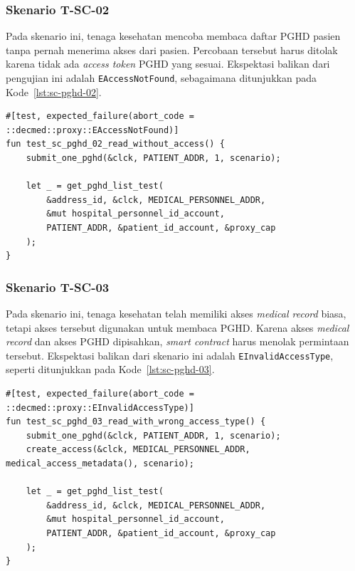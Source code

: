 \subsubsection{Skenario T-SC-02}

Pada skenario ini, tenaga kesehatan mencoba membaca daftar PGHD pasien tanpa pernah menerima akses dari pasien.
Percobaan tersebut harus ditolak karena tidak ada \textit{access token} PGHD yang sesuai.
Ekspektasi balikan dari pengujian ini adalah \texttt{EAccessNotFound}, sebagaimana ditunjukkan pada Kode~\ref{lst:sc-pghd-02}.

\begin{lstlisting}[caption={Pengujian baca PGHD tanpa akses pasien}, label={lst:sc-pghd-02}, float=htb]
#[test, expected_failure(abort_code = ::decmed::proxy::EAccessNotFound)]
fun test_sc_pghd_02_read_without_access() {
    submit_one_pghd(&clck, PATIENT_ADDR, 1, scenario);

    let _ = get_pghd_list_test(
        &address_id, &clck, MEDICAL_PERSONNEL_ADDR,
        &mut hospital_personnel_id_account,
        PATIENT_ADDR, &patient_id_account, &proxy_cap
    );
}
\end{lstlisting}

\subsubsection{Skenario T-SC-03}

Pada skenario ini, tenaga kesehatan telah memiliki akses \textit{medical record} biasa, tetapi akses tersebut digunakan untuk membaca PGHD\@.
Karena akses \textit{medical record} dan akses PGHD dipisahkan, \textit{smart contract} harus menolak permintaan tersebut.
Ekspektasi balikan dari skenario ini adalah \texttt{EInvalidAccessType}, seperti ditunjukkan pada Kode~\ref{lst:sc-pghd-03}.

\begin{lstlisting}[caption={Pengujian penggunaan akses medical record untuk membaca PGHD}, label={lst:sc-pghd-03}, float=htb]
#[test, expected_failure(abort_code = ::decmed::proxy::EInvalidAccessType)]
fun test_sc_pghd_03_read_with_wrong_access_type() {
    submit_one_pghd(&clck, PATIENT_ADDR, 1, scenario);
    create_access(&clck, MEDICAL_PERSONNEL_ADDR, medical_access_metadata(), scenario);

    let _ = get_pghd_list_test(
        &address_id, &clck, MEDICAL_PERSONNEL_ADDR,
        &mut hospital_personnel_id_account,
        PATIENT_ADDR, &patient_id_account, &proxy_cap
    );
}
\end{lstlisting}

